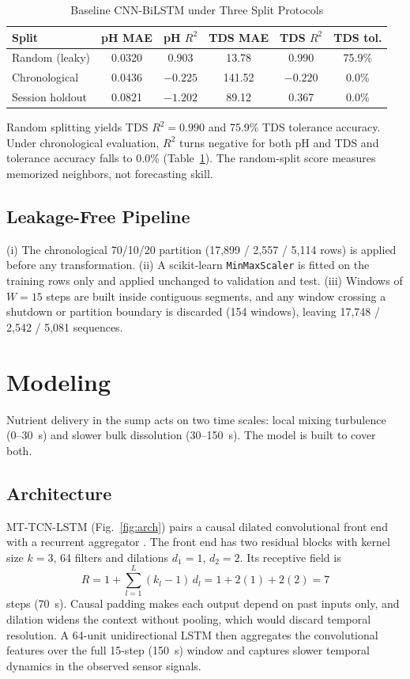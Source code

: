 \begin{table}[t]
\caption{Baseline CNN-BiLSTM under Three Split Protocols}
\label{tab:leakage}
\centering
\scriptsize
\setlength{\tabcolsep}{3.2pt}
\begin{tabular}{lccccc}
\toprule
Split & pH MAE & pH $R^2$ & TDS MAE & TDS $R^2$ & TDS tol. \\
\midrule
Random (leaky)    & 0.0320 & 0.903  & 13.78  & 0.990  & 75.9\% \\
Chronological     & 0.0436 & $-0.225$ & 141.52 & $-0.220$ & 0.0\% \\
Session holdout   & 0.0821 & $-1.202$ & 89.12  & 0.367  & 0.0\% \\
\bottomrule
\end{tabular}
\end{table}

Random splitting yields TDS $R^2=0.990$ and 75.9\% TDS tolerance accuracy. Under chronological evaluation, $R^2$ turns negative for both pH and TDS and tolerance accuracy falls to 0.0\% (Table~\ref{tab:leakage}). The random-split score measures memorized neighbors, not forecasting skill.

\subsection{Leakage-Free Pipeline}
(i) The chronological 70/10/20 partition (17,899 / 2,557 / 5,114 rows) is applied before any transformation. (ii) A scikit-learn \texttt{MinMaxScaler} is fitted on the training rows only and applied unchanged to validation and test. (iii) Windows of $W=15$ steps are built inside contiguous segments, and any window crossing a shutdown or partition boundary is discarded (154 windows), leaving 17,748 / 2,542 / 5,081 sequences.

\section{Modeling}\label{sec:model}
Nutrient delivery in the sump acts on two time scales: local mixing turbulence (0--30~s) and slower bulk dissolution (30--150~s). The model is built to cover both.

\subsection{Architecture}
MT-TCN-LSTM (Fig.~\ref{fig:arch}) pairs a causal dilated convolutional front end \cite{bai2018} with a recurrent aggregator \cite{hochreiter1997}. The front end has two residual blocks with kernel size $k=3$, 64 filters and dilations $d_1=1$, $d_2=2$. Its receptive field is
\begin{equation}
R = 1+\sum_{l=1}^{L}(k_l-1)\,d_l = 1+2(1)+2(2) = 7
\end{equation}
steps (70~s). Causal padding makes each output depend on past inputs only, and dilation widens the context without pooling, which would discard temporal resolution. A 64-unit unidirectional LSTM then aggregates the convolutional features over the full 15-step (150~s) window and captures slower temporal dynamics in the observed sensor signals.

